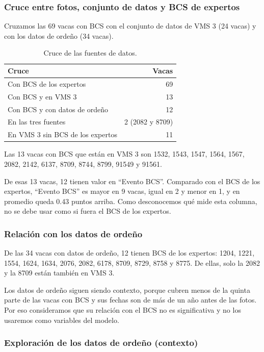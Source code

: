 \subsubsection*{Cruce entre fotos, conjunto de datos y BCS de expertos}

Cruzamos las 69 vacas con BCS con el conjunto de datos de VMS 3 (24 vacas) y con los datos de ordeño (34 vacas).

\begin{table}[H]
  \centering
  \caption{Cruce de las fuentes de datos.}
  \label{tab:cruce}
  \begin{tabular}{lr}
    \toprule
    Cruce & Vacas \\
    \midrule
    Con BCS de los expertos & 69 \\
    Con BCS y en VMS 3 & 13 \\
    Con BCS y con datos de ordeño & 12 \\
    En las tres fuentes & 2 (2082 y 8709) \\
    En VMS 3 sin BCS de los expertos & 11 \\
    \bottomrule
  \end{tabular}
\end{table}

Las 13 vacas con BCS que están en VMS 3 son 1532, 1543, 1547, 1564, 1567, 2082, 2142, 6137, 8709, 8744, 8799, 91549 y 91561.

De esas 13 vacas, 12 tienen valor en ``Evento BCS''. Comparado con el BCS de los expertos, ``Evento BCS'' es mayor en 9 vacas, igual en 2 y menor en 1, y en promedio queda 0.43 puntos arriba. Como desconocemos qué mide esta columna, no se debe usar como si fuera el BCS de los expertos.

\subsubsection*{Relación con los datos de ordeño}

De las 34 vacas con datos de ordeño, 12 tienen BCS de los expertos: 1204, 1221, 1554, 1624, 1634, 2076, 2082, 6178, 8709, 8729, 8758 y 8775. De ellas, solo la 2082 y la 8709 están también en VMS 3.

Los datos de ordeño siguen siendo contexto, porque cubren menos de la quinta parte de las vacas con BCS y sus fechas son de más de un año antes de las fotos. Por eso consideramos que su relación con el BCS no es significativa y no los usaremos como variables del modelo.

\subsubsection*{Exploración de los datos de ordeño (contexto)}

